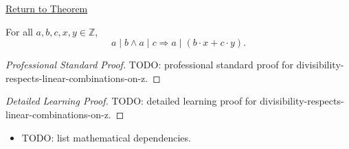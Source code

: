 \newpage
{}
\label{prf:divisibility-respects-linear-combinations-on-z}

\begin{remark*}[Return]
\hyperref[prop:divisibility-respects-linear-combinations-on-z]{Return to Theorem}
\end{remark*}

\begin{proposition*}
For all $a,b,c,x,y\in\mathbb{Z}$,
\[
a\mid b\land a\mid c \Longrightarrow a\mid(b\cdot x+c\cdot y).
\]
\end{proposition*}

\begin{proof}[Professional Standard Proof]
\LRAProofBodyStart
TODO: professional standard proof for divisibility-respects-linear-combinations-on-z.
\end{proof}

\begin{proof}[Detailed Learning Proof]
\LRAProofBodyStart
TODO: detailed learning proof for divisibility-respects-linear-combinations-on-z.
\end{proof}

\begin{remark*}
\end{remark*}

\begin{dependencies}
\begin{itemize}
  \item TODO: list mathematical dependencies.
\end{itemize}
\end{dependencies}

\clearpage
